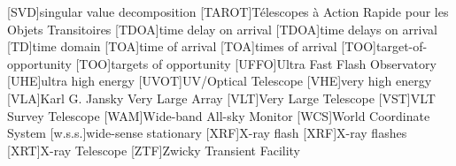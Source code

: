 \begin{acronym}
[SVD]{singular value decomposition}
[TAROT]{T\'{e}lescopes \`{a} Action Rapide pour les Objets Transitoires}
[TDOA]{time delay on arrival}
[TDOA]{time delays on arrival}
[TD]{time domain}
[TOA]{time of arrival}
[TOA]{times of arrival}
[TOO]{target\nobreakdashes-of\nobreakdashes-opportunity}
[TOO]{targets of opportunity}
[UFFO]{Ultra Fast Flash Observatory}
[UHE]{ultra high energy}
[UVOT]{UV/Optical Telescope}
[VHE]{very high energy}
[VLA]{Karl G. Jansky Very Large Array}
[VLT]{Very Large Telescope}
[VST]{\acs{VLT} Survey Telescope}
[WAM]{Wide\nobreakdashes-band All\nobreakdashes-sky Monitor}
[WCS]{World Coordinate System}
[w.s.s.]{wide\nobreakdashes-sense stationary}
[XRF]{X\nobreakdashes-ray flash}
[XRF]{X\nobreakdashes-ray flashes}
[XRT]{X\nobreakdashes-ray Telescope}
[ZTF]{Zwicky Transient Facility}
\end{acronym}
